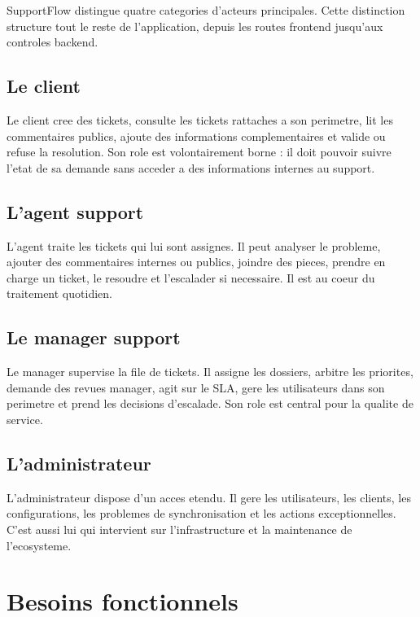 \documentclass[12pt,a4paper,oneside]{report}
\begin{document}
SupportFlow distingue quatre categories d'acteurs principales. Cette distinction structure tout le reste de l'application, depuis les routes frontend jusqu'aux controles backend.

\subsection{Le client}

Le client cree des tickets, consulte les tickets rattaches a son perimetre, lit les commentaires publics, ajoute des informations complementaires et valide ou refuse la resolution. Son role est volontairement borne : il doit pouvoir suivre l'etat de sa demande sans acceder a des informations internes au support.

\subsection{L'agent support}

L'agent traite les tickets qui lui sont assignes. Il peut analyser le probleme, ajouter des commentaires internes ou publics, joindre des pieces, prendre en charge un ticket, le resoudre et l'escalader si necessaire. Il est au coeur du traitement quotidien.

\subsection{Le manager support}

Le manager supervise la file de tickets. Il assigne les dossiers, arbitre les priorites, demande des revues manager, agit sur le SLA, gere les utilisateurs dans son perimetre et prend les decisions d'escalade. Son role est central pour la qualite de service.

\subsection{L'administrateur}

L'administrateur dispose d'un acces etendu. Il gere les utilisateurs, les clients, les configurations, les problemes de synchronisation et les actions exceptionnelles. C'est aussi lui qui intervient sur l'infrastructure et la maintenance de l'ecosysteme.

\section{Besoins fonctionnels}
\end{document}
